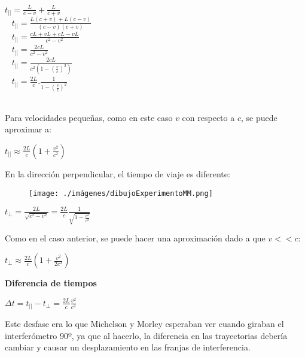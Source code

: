\documentclass[a4paper, 12pt]{article}
\begin{document}
		\begin{center}
			${t_{||}} = {\frac{L}{c-v}} + {\frac{L}{c+v}}$ \\ \
			\newline
			${t_{||}} = \frac{L(c+v) + L(c-v)}{(c-v)(c+v)}$ \\ \
			\newline
			${t_{||}} = \frac{cL + vL + cL - vL}{c^2 - v^2}$ \\ \
			\newline
			${t_{||}} = \frac{2cL}{c^2 - v^2}$ \\ \
			\newline
			${t_{||}} = \frac{2cL} {c^2(1 - (\frac{v}{c})^2)}$ \\ \
			\newline
			${t_{||}} = {\frac{2L}{c}} . \frac {1}{1- (\frac{v}{c})^2}$ \\ \
		\end{center}
		\newpage
		\indent Para velocidades pequeñas, como en este caso $v$ con respecto a $c$, se puede aproximar a:
		
		\begin{center}
			${t_{||}} \approx {\frac{2L}{c}} (1 + \frac{v^2}{c^2})$
		\end{center}
		
		\indent En la dirección perpendicular, el tiempo de viaje es diferente:
		\begin{figure}[h!]
			\centering
			\texttt{[image: ./imágenes/dibujoExperimentoMM.png]}
			
			
		\end{figure}
		\begin{center}
			$t_{\perp} = \frac{2L}{\sqrt{c^2 - v^2}} = {\frac{2L}{c}} \frac{1}{\sqrt{1 - \frac{v^2}{c^2}}}$  
		\end{center}
		
		\indent Como en el caso anterior, se puede hacer una aproximación dado a que $v << c$:
		
		\begin{center}
			${t_{\perp}} \approx {\frac{2L}{c}} (1 + \frac{v^2}{2c^2})$
		\end{center}
		
		\textbf{Diferencia de tiempos}
		
		\begin{center}
			$\Delta t = {t_{||}} - {t_{\perp}} = {\frac{2L}{c}} {\frac{v^2}{c^2}}$
		\end{center}
		
		\indent Este desfase era lo que Michelson y Morley esperaban ver cuando giraban el interferómetro 90º, ya que al hacerlo, la diferencia en las trayectorias debería cambiar y causar un desplazamiento en las franjas de interferencia.
		
\end{document}
